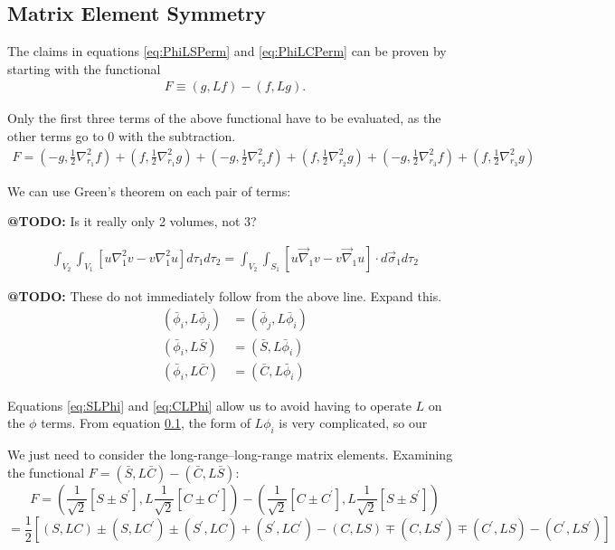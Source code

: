 \documentclass[Dissertation.tex]{subfiles}
\begin{document}
\subsection{Matrix Element Symmetry}
The claims in equations \ref{eq:PhiLSPerm} and \ref{eq:PhiLCPerm} can be proven by starting with the functional
\begin{align}
	F \equiv \left(g,Lf \right)-\left(f,Lg \right).
\end{align}

Only the first three terms of the above functional have to be evaluated, as the other terms go to 0 with the subtraction.
\begin{align}
	F=\left({-g,\frac{1}{2} \nabla_{r_1}^2 f}\right)+\left({f,\frac{1}{2} \nabla_{r_1}^2 g}\right)+
	\left({-g,\frac{1}{2} \nabla_{r_2}^2 f}\right)+\left({f,\frac{1}{2} \nabla_{r_2}^2 g}\right)+
	\left({-g,\frac{1}{2} \nabla_{r_3}^2 f}\right)+\left({f,\frac{1}{2} \nabla_{r_3}^2 g}\right)
\end{align}

We can use Green's theorem on each pair of terms:

\textbf{@TODO:} Is it really only 2 volumes, not 3?

\begin{align}
	{\int _{V_2}{{\int_{V_1}{\left[{u{\nabla }_1^2 v-v{\nabla }_1^2 u}\right]{d \tau_1}}}{d \tau_2}}}
	= \int_{V_2} \int_{S_1} \left[u \vec{\nabla}_1 v - v \vec{\nabla}_1 u \right] \cdot d\vec{\sigma}_1 d\tau_2
\end{align}

\textbf{@TODO:} These do not immediately follow from the above line. Expand this.
\begin{subequations}
\label{eq:elem_symm}
\begin{align}
\left(\bar{\phi}_i, L \bar{\phi}_j \right) &= \left(\bar{\phi}_j, L \bar{\phi}_i \right) \\
\left(\bar{\phi}_i, L \bar{S} \right) &= \left(\bar{S}, L \bar{\phi}_i \right) \label{eq:SLPhi} \\
\left(\bar{\phi}_i, L \bar{C} \right) &= \left(\bar{C}, L \bar{\phi}_i \right) \label{eq:CLPhi}
\end{align}
\end{subequations}

\noindent Equations \ref{eq:SLPhi} and \ref{eq:CLPhi} allow us to avoid having to operate $L$ on the $\phi$ terms. From equation \ref{}, the form of $L\phi_i$ is very complicated, so our 

We just need to consider the long-range--long-range matrix elements. Examining the functional
 $F = \left(\bar{S}, L\bar{C}\right) - \left(\bar{C}, L\bar{S}\right)$:
\begin{equation*}
F = \left(\frac{1}{\sqrt{2}} \left[S \pm S^\prime \right], L \frac{1}{\sqrt{2}}\left[C \pm C^\prime \right] \right) -
    \left(\frac{1}{\sqrt{2}} \left[C \pm C^\prime \right], L \frac{1}{\sqrt{2}}\left[S \pm S^\prime \right] \right)
\end{equation*}
\begin{equation}
= \frac{1}{2}\left[(S,LC) \pm (S,LC^\prime) \pm (S^\prime,LC) + (S^\prime,LC^\prime) - (C,LS) \mp (C,LS^\prime) \mp (C^\prime,LS) - (C^\prime,LS^\prime)\right]
\end{equation}
\end{document}
